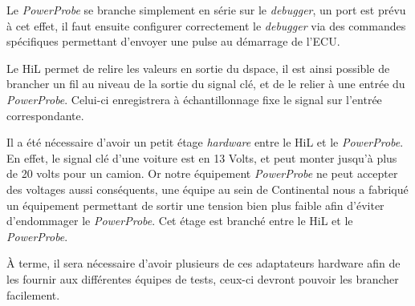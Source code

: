 Le \textit{PowerProbe} se branche simplement en série sur le \textit{debugger}, un port est prévu à cet effet, il faut ensuite configurer correctement le \textit{debugger} via des commandes spécifiques permettant d'envoyer une pulse au démarrage de l'ECU. 

Le HiL permet de relire les valeurs en sortie du dspace, il est ainsi possible de brancher un fil au niveau de la sortie du signal clé, et de le relier à une entrée du \textit{PowerProbe}. Celui-ci enregistrera à échantillonnage fixe le signal sur l'entrée correspondante. 


\begin{remarque}
Il a été nécessaire d'avoir un petit étage \textit{hardware} entre le HiL et le \textit{PowerProbe}. En effet, le signal clé d'une voiture est en 13 Volts, et peut monter jusqu'à plus de 20 volts pour un camion. Or notre équipement \textit{PowerProbe} ne peut accepter des voltages aussi conséquents, une équipe au sein de Continental nous a fabriqué un équipement permettant de sortir une tension bien plus faible afin d'éviter d'endommager le \textit{PowerProbe}. Cet étage est branché entre le HiL et le \textit{PowerProbe}. 

À terme, il sera nécessaire d'avoir plusieurs de ces adaptateurs hardware afin de les fournir aux différentes équipes de tests, ceux-ci devront pouvoir les brancher facilement.
\end{remarque}

